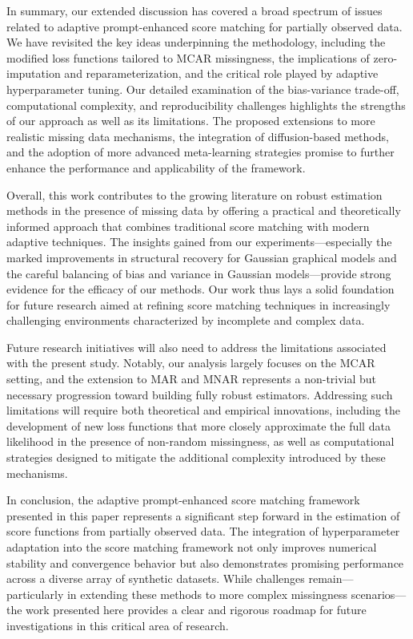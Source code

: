 \documentclass{article} %
\begin{document}
In summary, our extended discussion has covered a broad spectrum of issues related to adaptive prompt-enhanced score matching for partially observed data. We have revisited the key ideas underpinning the methodology, including the modified loss functions tailored to MCAR missingness, the implications of zero-imputation and reparameterization, and the critical role played by adaptive hyperparameter tuning. Our detailed examination of the bias-variance trade-off, computational complexity, and reproducibility challenges highlights the strengths of our approach as well as its limitations. The proposed extensions to more realistic missing data mechanisms, the integration of diffusion-based methods, and the adoption of more advanced meta-learning strategies promise to further enhance the performance and applicability of the framework.

Overall, this work contributes to the growing literature on robust estimation methods in the presence of missing data by offering a practical and theoretically informed approach that combines traditional score matching with modern adaptive techniques. The insights gained from our experiments—especially the marked improvements in structural recovery for Gaussian graphical models and the careful balancing of bias and variance in Gaussian models—provide strong evidence for the efficacy of our methods. Our work thus lays a solid foundation for future research aimed at refining score matching techniques in increasingly challenging environments characterized by incomplete and complex data.

Future research initiatives will also need to address the limitations associated with the present study. Notably, our analysis largely focuses on the MCAR setting, and the extension to MAR and MNAR represents a non-trivial but necessary progression toward building fully robust estimators. Addressing such limitations will require both theoretical and empirical innovations, including the development of new loss functions that more closely approximate the full data likelihood in the presence of non-random missingness, as well as computational strategies designed to mitigate the additional complexity introduced by these mechanisms.

In conclusion, the adaptive prompt-enhanced score matching framework presented in this paper represents a significant step forward in the estimation of score functions from partially observed data. The integration of hyperparameter adaptation into the score matching framework not only improves numerical stability and convergence behavior but also demonstrates promising performance across a diverse array of synthetic datasets. While challenges remain—particularly in extending these methods to more complex missingness scenarios—the work presented here provides a clear and rigorous roadmap for future investigations in this critical area of research.



\end{document}
